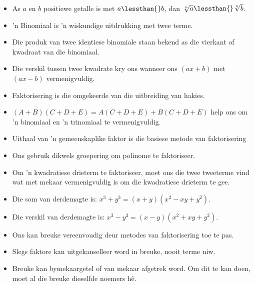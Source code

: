 \begin{itemize}[itemsep=5pt, label=\textbullet{}]
\item As $a$ en $b$ positiewe getalle is met $a\lessthan{}b$, dan $\sqrt[n]{a}\lessthan{}\sqrt[n]{b}$.
\item ’n Binomiaal is ’n wiskundige uitdrukking met twee terme.
\item Die produk van twee identiese binomiale staan bekend as die vierkant of kwadraat van die binomiaal. 
\item Die verskil tussen twee kwadrate kry ons wanneer ons $(ax+b)$ met $(ax-b)$ vermenigvuldig.
\item Faktorisering is die omgekeerde van die uitbreiding van hakies.
\item $(A+B)(C+D+E)=A(C+D+E)+B(C+D+E)$ help ons om ’n binomiaal en ’n trinomiaal te vermenigvuldig.
\item Uithaal van 'n gemeenskaplike faktor is die basiese metode van faktorisering
\item Ons gebruik dikwels groepering om polinome te faktoriseer.
\item Om ’n kwadratiese drieterm te faktoriseer, moet ons die twee tweeterme vind wat met mekaar vermenigvuldig is om die kwadratiese drieterm te gee.
\item Die som van derdemagte is: ${x}^{3}+{y}^{3}=(x+y)({x}^{2}-xy+{y}^{2})$. 
\item Die verskil van derdemagte is: ${x}^{3}-{y}^{3}=(x-y)({x}^{2}+xy+{y}^{2})$.
\item Ons kan breuke vereenvoudig deur metodes van faktorisering toe te pas.
\item Slegs faktore kan uitgekanselleer word in breuke, nooit terme niw.
\item Breuke kan bymekaargetel of van mekaar afgetrek word. Om dit te kan doen, moet al die breuke dieselfde
noemers hê.

\end{itemize}


